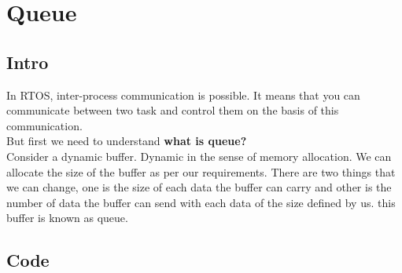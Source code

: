 \documentclass[11pt,a4paper]{book}
\begin{document}
	\section{Queue}
	 \subsection{Intro}
	 In RTOS, inter-process communication is possible. It means that you can communicate between two task and control them on the basis of this communication.\\ But first we need to understand \textbf {what is queue?}\\
	Consider a dynamic buffer. Dynamic in the sense of memory allocation. We can allocate the size of the buffer as per our requirements. There are two things that we can change, one is the size of each data the buffer can carry and other is the number of data the buffer can send with each data of the size defined by us. this buffer is known as queue.\\
	
	\subsection{Code}
	
	
\end{document}

